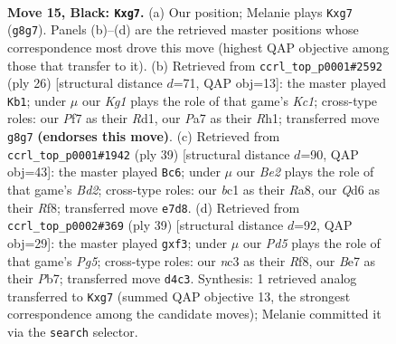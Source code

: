 \documentclass[11pt]{article}
\begin{document}
\clearpage

\begin{figure}[p]\centering
\begin{subfigure}{0.46\textwidth}\centering
\resizebox{\linewidth}{!}{%
\newchessgame
\chessboard[
  setfen={1rr3k1/ppp1bpPp/1n1qb3/7Q/P2pP3/2N3P1/1P3PB1/R1B1K2R b KQ - 1 15},
  showmover=false,
  pgfstyle=straightmove, color=movearrow, markmove={g8-g7}
]}
\caption{}
\end{subfigure}\hfill
\begin{subfigure}{0.46\textwidth}\centering
\resizebox{\linewidth}{!}{%
\newchessgame
\chessboard[
  setfen={r4rk1/pp1bbpp1/4pn1p/q7/2BN3B/2P5/PP2QPPP/2KR3R w - - 7 14},
  showmover=false,
  pgfstyle=straightmove, color=movearrow, markmove={c1-b1}
]}
\caption{}
\end{subfigure}
\\[4pt]
\begin{subfigure}{0.46\textwidth}\centering
\resizebox{\linewidth}{!}{%
\newchessgame
\chessboard[
  setfen={r4rk1/pp1b2p1/3qpb1p/3nNp2/2BP4/P1BQ4/1P3PPP/R3R1K1 b - - 11 20},
  showmover=false,
  pgfstyle=straightmove, color=movearrow, markmove={d7-c6}
]}
\caption{}
\end{subfigure}\hfill
\begin{subfigure}{0.46\textwidth}\centering
\resizebox{\linewidth}{!}{%
\newchessgame
\chessboard[
  setfen={r4rk1/ppp1pp2/3qb2Q/3n4/6pP/2P2NP1/P3PPB1/R3K2R b KQ - 0 20},
  showmover=false,
  pgfstyle=straightmove, color=movearrow, markmove={g4-f3}
]}
\caption{}
\end{subfigure}
\caption{\textbf{Move 15, Black: \texttt{Kxg7}.} (a) Our position; Melanie plays \texttt{Kxg7} (\texttt{g8g7}). Panels (b)--(d) are the retrieved master positions whose correspondence most drove this move (highest QAP objective among those that transfer to it). (b) Retrieved from \texttt{ccrl\_top\_p0001\#2592} (ply 26) [structural distance $d$=71, QAP obj=13]: the master played \texttt{Kb1}; under $\mu$ our \emph{Kg1} plays the role of that game's \emph{Kc1}; cross-type roles: our \emph{P}f7 as their \emph{R}d1, our \emph{P}a7 as their \emph{R}h1; transferred move \texttt{g8g7} \textbf{(endorses this move)}. (c) Retrieved from \texttt{ccrl\_top\_p0001\#1942} (ply 39) [structural distance $d$=90, QAP obj=43]: the master played \texttt{Bc6}; under $\mu$ our \emph{Be2} plays the role of that game's \emph{Bd2}; cross-type roles: our \emph{b}c1 as their \emph{R}a8, our \emph{Q}d6 as their \emph{R}f8; transferred move \texttt{e7d8}. (d) Retrieved from \texttt{ccrl\_top\_p0002\#369} (ply 39) [structural distance $d$=92, QAP obj=29]: the master played \texttt{gxf3}; under $\mu$ our \emph{Pd5} plays the role of that game's \emph{Pg5}; cross-type roles: our \emph{n}c3 as their \emph{R}f8, our \emph{B}e7 as their \emph{P}b7; transferred move \texttt{d4c3}. Synthesis: 1 retrieved analog transferred to \texttt{Kxg7} (summed QAP objective 13, the strongest correspondence among the candidate moves); Melanie committed it via the \texttt{search} selector.}
\label{fig:thought-m29}
\end{figure}
\end{document}
